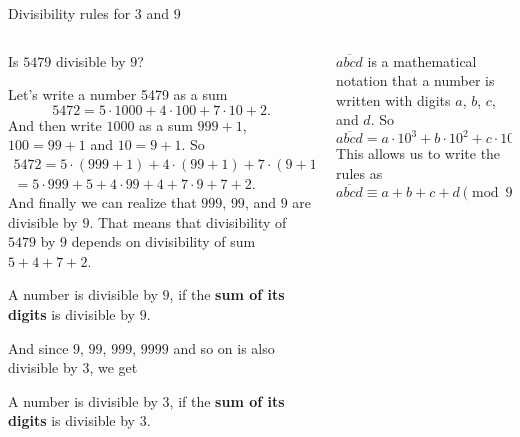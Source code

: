 \documentclass[9pt,aspectratio=169]{beamer}
\begin{document}
\begin{frame}{Divisibility rules for 3 and 9}
  \begin{columns}[T]
    \begin{column}{0.5\textwidth}
      \begin{problem}
        Is $5479$ divisible by $9$?
      \end{problem}
      Let's write a number 5479 as a sum
      \[ 5472 = 5 \cdot 1000 + 4 \cdot 100 + 7 \cdot 10 + 2. \]
      And then write $1000$ as a sum $999 + 1$, $100 = 99 + 1$ and $10 = 9 + 1$. So 
      \begin{multline*}
        5472 = 5 \cdot (999 + 1) + 4 \cdot (99 + 1) + 7 \cdot (9 + 1) + 9 = \\
        = 5 \cdot 999 + 5 + 4 \cdot 99 + 4 + 7 \cdot 9 + 7 + 2.
      \end{multline*}
      And finally we can realize that $999$, $99$, and $9$ are divisible by $9$. That means that divisibility of $5479$ by $9$ depends on divisibility of sum $5 + 4 + 7 + 2$.
      \begin{definition}
        A number is divisible by $9$, if the \textbf{sum of its digits} is divisible by $9$.
      \end{definition}
      And since $9$, $99$, $999$, $9999$ and so on is also divisible by $3$, we get
      \begin{definition}
        A number is divisible by $3$, if the \textbf{sum of its digits} is divisible by $3$.
      \end{definition}
    \end{column}
    \begin{column}{0.5\textwidth}

      \begin{example}
        $\overline{abcd}$ is a mathematical notation that a number is written with digits $a$, $b$, $c$, and $d$. So
        \[ \overline{abcd} = a \cdot 10^3 + b \cdot 10^2 + c \cdot 10 + d. \]
        This allows us to write the rules as
        \[
           \overline{abcd} \equiv a + b + c + d \pmod{9 \text{ or } 3}. 
        \]
        \vspace*{-1em}
      \end{example}\medskip


\end{column}
\end{columns}
\end{frame}
\end{document}
